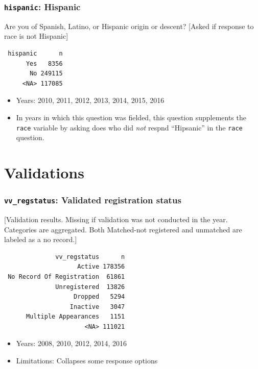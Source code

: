 \documentclass[10pt,article,oneside]{memoir}
\theoremstyle{definition}
\begin{document}
\subsubsection{\texorpdfstring{\texttt{hispanic}:
Hispanic}{hispanic: Hispanic}}\label{hispanic-hispanic}

Are you of Spanish, Latino, or Hispanic origin or descent? {[}Asked if
response to race is not Hispanic{]}

\begin{verbatim}
 hispanic      n
      Yes   8356
       No 249115
     <NA> 117085
\end{verbatim}

\begin{itemize}
\tightlist
\item
  Years: 2010, 2011, 2012, 2013, 2014, 2015, 2016
\item
  In years in which this question was fielded, this question supplements
  the \texttt{race} variable by asking does who did \emph{not} respnd
  ``Hipsanic'' in the \texttt{race} question.
\end{itemize}

\newpage

\section{Validations}\label{validations}

\subsubsection{\texorpdfstring{\texttt{vv\_regstatus}: Validated
registration
status}{vv\_regstatus: Validated registration status}}\label{vv_regstatus-validated-registration-status}

{[}Validation results. Missing if validation was not conducted in the
year. Categories are aggregated. Both Matched-not registered and
unmatched are labeled as a no record.{]}

\begin{verbatim}
              vv_regstatus      n
                    Active 178356
 No Record Of Registration  61861
              Unregistered  13826
                   Dropped   5294
                  Inactive   3047
      Multiple Appearances   1151
                      <NA> 111021
\end{verbatim}

\begin{itemize}
\tightlist
\item
  Years: 2008, 2010, 2012, 2014, 2016
\item
  Limitations: Collapses some response options
\end{itemize}
\end{document}
